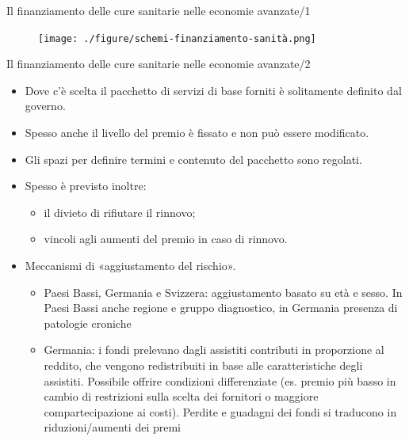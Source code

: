 \documentclass[aspectratio=64,12pt]{beamer}
\begin{document}
\begin{frame}{Il finanziamento delle cure sanitarie nelle economie avanzate/1}
\begin{figure}[htbp]
\centering
\texttt{[image: ./figure/schemi-finanziamento-sanità.png]}
\end{figure}
\end{frame}


\begin{frame}{Il finanziamento delle cure sanitarie nelle economie avanzate/2}
\begin{itemize}
\item Dove c’è scelta il pacchetto di servizi di base forniti è solitamente
definito dal governo.
\item Spesso anche il livello del premio è fissato e non può essere modificato.
\item Gli spazi per definire termini e contenuto del pacchetto sono regolati.
\item Spesso è previsto inoltre:
\begin{itemize}
\item il divieto di rifiutare il rinnovo;
\item vincoli agli aumenti del premio in caso di rinnovo.
\end{itemize}
\item Meccanismi di «aggiustamento del rischio».
\begin{itemize}
\item Paesi Bassi, Germania e Svizzera: aggiustamento basato su età e sesso. In
Paesi Bassi anche regione e gruppo diagnostico, in Germania presenza di
patologie croniche
\item Germania: i fondi prelevano dagli assistiti contributi in proporzione al
reddito, che vengono redistribuiti in base alle caratteristiche degli
assistiti. Possibile offrire condizioni differenziate (es. premio più
basso in cambio di restrizioni sulla scelta dei fornitori o maggiore
compartecipazione ai costi). Perdite e guadagni dei fondi si traducono in
riduzioni/aumenti dei premi
\end{itemize}
\end{itemize}
\end{frame}
\end{document}
